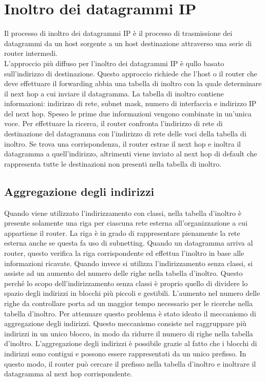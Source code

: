 \documentclass[12pt]{report}
\begin{document}
\section{Inoltro dei datagrammi IP}
Il processo di inoltro dei datagrammi IP è il processo di trasmissione dei datagrammi da un host sorgente a un host destinazione attraverso una serie di router intermedi.
\vspace{\baselineskip}\\
L'approccio più diffuso per l'inoltro dei datagrammi IP è qullo basato sull'indirizzo di destinazione. Questo approccio richiede che l'host o il router che deve effettuare il forwarding abbia una tabella di inoltro con la quale determinare il next hop a cui inviare il datagramma. La tabella di inoltro contiene informazioni: indirizzo di rete, subnet mask, numero di interfaccia e indirizzo IP del next hop. Spesso le prime due informazioni vengono combinate in un'unica voce. Per effettuare la ricerca, il router confronta l'indirizzo di rete di destinazione del datagramma con l'indirizzo di rete delle voci della tabella di inoltro. Se trova una corrispondenza, il router estrae il next hop e inoltra il datagramma a quell'indirizzo, altrimenti viene inviato al next hop di default che rappresenta tutte le destinazioni non presenti nella tabella di inoltro.

\subsection{Aggregazione degli indirizzi}
Quando viene utilizzato l'indirizzamento con classi, nella tabella d'inoltro è presente solamente una riga per ciascuna rete esterna all'organizzazione a cui appartiene il router. La riga è in grado di rappresentare pienamente la rete esterna anche se questa fa uso di subnetting. Quando un datagramma arriva al router, questo verifica la riga corrispondente ed effettua l'inoltro in base alle informazioni ricavate. Quando invece si utilizza l'indirizzamento senza classi, si assiste ad un aumento del numero delle righe nella tabella d'inoltro. Questo perché lo scopo dell'indirizzamento senza classi è proprio quello di dividere lo spazio degli indirizzi in blocchi più piccoli e gestibili. L'aumento nel numero delle righe da controllare porta ad un maggior tempo necessario per le ricerche nella tabella d'inoltro. Per attenuare questo problema è stato ideato il meccanismo di aggregazione degli indirizzi. Questo meccanismo consiste nel raggruppare più indirizzi in un unico blocco, in modo da ridurre il numero di righe nella tabella d'inoltro. L'aggregazione degli indirizzi è possibile grazie al fatto che i blocchi di indirizzi sono contigui e possono essere rappresentati da un unico prefisso. In questo modo, il router può cercare il prefisso nella tabella d'inoltro e inoltrare il datagramma al next hop corrispondente.
\end{document}
